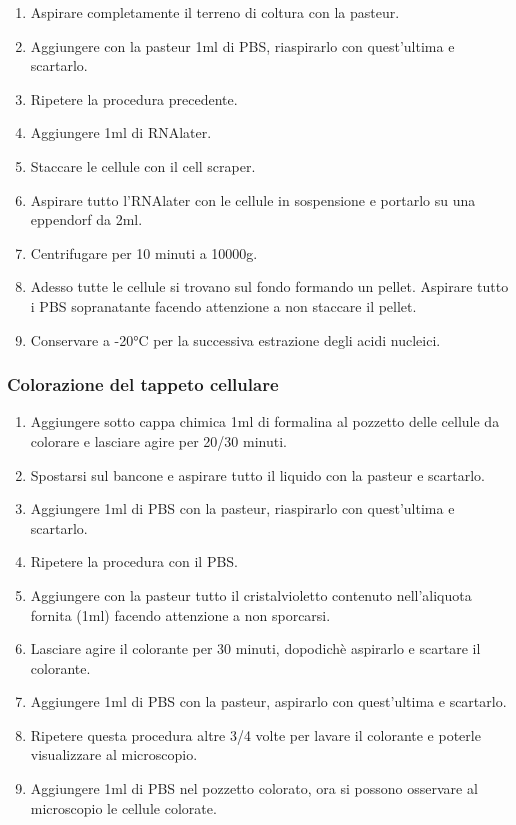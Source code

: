 \begin{enumerate}
    \item Aspirare completamente il terreno di coltura con la pasteur.
    \item Aggiungere con la pasteur 1ml di PBS, riaspirarlo con quest'ultima e scartarlo.
    \item Ripetere la procedura precedente.
    \item Aggiungere 1ml di RNAlater.
    \item Staccare le cellule con il cell scraper.
    \item Aspirare tutto l'RNAlater con le cellule in sospensione e portarlo su una
    eppendorf da 2ml.
    \item Centrifugare per 10 minuti a 10000g.
    \item Adesso tutte le cellule si trovano sul fondo formando un pellet. Aspirare tutto
    i PBS sopranatante facendo attenzione a non staccare il pellet.
    \item Conservare a -20°C per la successiva estrazione degli acidi nucleici.
\end{enumerate}

\subsubsection{Colorazione del tappeto cellulare}

\begin{enumerate}
    \item Aggiungere sotto cappa chimica 1ml di formalina al pozzetto delle cellule da
    colorare e lasciare agire per 20/30 minuti.
    \item Spostarsi sul bancone e aspirare tutto il liquido con la pasteur e scartarlo.
    \item Aggiungere 1ml di PBS con la pasteur, riaspirarlo con quest'ultima e scartarlo.
    \item Ripetere la procedura con il PBS.
    \item Aggiungere con la pasteur tutto il cristalvioletto contenuto nell'aliquota fornita
    (1ml) facendo attenzione a non sporcarsi.
    \item Lasciare agire il colorante per 30 minuti, dopodich\`e aspirarlo e scartare il colorante.
    \item Aggiungere 1ml di PBS con la pasteur, aspirarlo con quest'ultima e scartarlo.
    \item Ripetere questa procedura altre 3/4 volte per lavare il colorante e poterle visualizzare
    al microscopio.
    \item Aggiungere 1ml di PBS nel pozzetto colorato, ora si possono osservare al
    microscopio le cellule colorate.
\end{enumerate}

